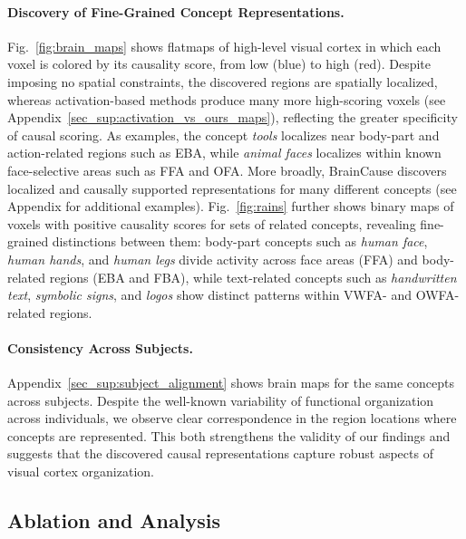 \documentclass{article}
\begin{document}
\paragraph{Discovery of Fine-Grained Concept Representations.}
Fig.~\ref{fig:brain_maps} shows flatmaps of high-level visual cortex in which each voxel is colored by its causality score, from low (blue) to high (red). Despite imposing no spatial constraints, the discovered regions are spatially localized, whereas activation-based methods produce many more high-scoring voxels (see Appendix~\ref{sec_sup:activation_vs_ours_maps}), reflecting the greater specificity of causal scoring. As examples, the concept \emph{tools} localizes near body-part and action-related regions such as EBA, while \emph{animal faces} localizes within known face-selective areas such as FFA and OFA. More broadly, BrainCause discovers localized and causally supported representations for many different concepts (see Appendix for additional examples). Fig.~\ref{fig:rains} further shows binary maps of voxels with positive causality scores for sets of related concepts, revealing fine-grained distinctions between them: body-part concepts such as \emph{human face}, \emph{human hands}, and \emph{human legs} divide activity across face areas (FFA) and body-related regions (EBA and FBA), while text-related concepts such as \emph{handwritten text}, \emph{symbolic signs}, and \emph{logos} show distinct patterns within VWFA- and OWFA-related regions.


\paragraph{Consistency Across Subjects.}
Appendix~\ref{sec_sup:subject_alignment} shows brain maps for the same concepts across subjects. Despite the well-known variability of functional organization across individuals, we observe clear correspondence in the region locations where concepts are represented. This both strengthens the validity of our findings and suggests that the discovered causal representations capture robust aspects of visual cortex organization.


\subsection{Ablation and Analysis}
\end{document}
